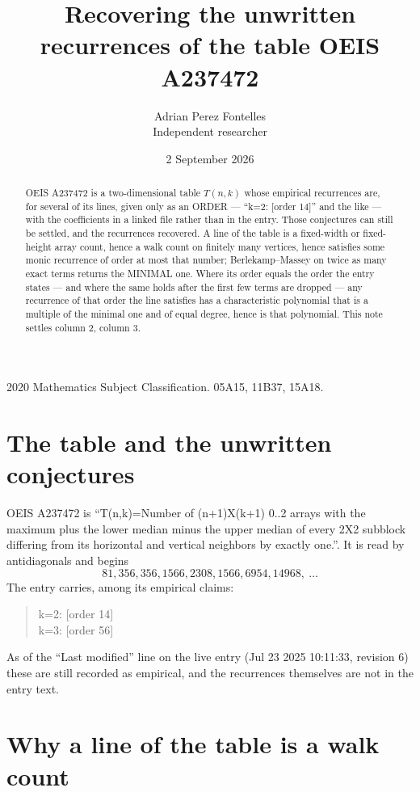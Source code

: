 \documentclass[11pt,a4paper]{article}
\title{Recovering the unwritten recurrences of the table OEIS A237472}
\author{Adrian Perez Fontelles\\ \small Independent researcher}
\date{2 September 2026}
\theoremstyle{plain}
\theoremstyle{definition}
\begin{document}
\maketitle

\begin{abstract}
OEIS A237472 is a two-dimensional table $T(n,k)$ whose empirical recurrences are, for several of
its lines, given only as an ORDER --- ``k=2: [order 14]'' and the like --- with the
coefficients in a linked file rather than in the entry. Those conjectures can still be settled,
and the recurrences recovered. A line of the table is a fixed-width or fixed-height array
count, hence a walk count on finitely many vertices, hence satisfies some monic recurrence of
order at most that number; Berlekamp--Massey on twice as many exact terms returns the MINIMAL
one. Where its order equals the order the entry states --- and where the same holds after the
first few terms are dropped --- any recurrence of that order the line satisfies has a
characteristic polynomial that is a multiple of the minimal one and of equal degree, hence is
that polynomial. This note settles column 2, column 3.
\end{abstract}

\noindent\small 2020 Mathematics Subject Classification. 05A15, 11B37, 15A18.\normalsize

\section{The table and the unwritten conjectures}

OEIS A237472 is ``T(n,k)=Number of (n+1)X(k+1) 0..2 arrays with the maximum plus the lower median minus the upper median of every 2X2 subblock differing from its horizontal and vertical neighbors by exactly one.''. It is read by antidiagonals and begins
\[
81, 356, 356, 1566, 2308, 1566, 6954, 14968,\ \dots
\]
The entry carries, among its empirical claims:
\begin{quote}\small
k=2: [order 14]\\
k=3: [order 56]
\end{quote}
As of the ``Last modified'' line on the live entry (Jul 23 2025 10:11:33, revision 6) these are still
recorded as empirical, and the recurrences themselves are not in the entry text.

\section{Why a line of the table is a walk count}
\end{document}
